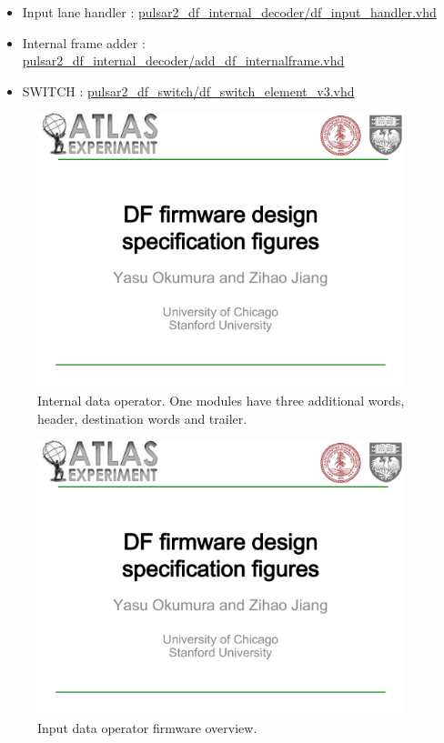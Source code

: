 \documentclass[11pt,letterpaper]{article}
\begin{document}
\begin{itemize}
\item Input lane handler : \url{pulsar2_df_internal_decoder/df_input_handler.vhd}
\item Internal frame adder : \url{pulsar2_df_internal_decoder/add_df_internalframe.vhd}
\item SWITCH : \url{pulsar2_df_switch/df_switch_element_v3.vhd}
\end{itemize}


\begin{figure}[h!]
  \centering
  \includegraphics[width=0.95\textwidth,clip,page=6]{figures.pdf}
  \caption{Internal data operator. One modules have three additional words, header, destination words and trailer.}
  \label{fig:INTERNAL_DATA_FORMAT}
\end{figure}

\begin{figure}[h!]
  \centering
  \includegraphics[width=0.95\textwidth,clip,page=7]{figures.pdf}
  \caption{Input data operator firmware overview.}
  \label{fig:INPUT_DATA_OPERATOR_OVERVIEW}
\end{figure}
\end{document}
